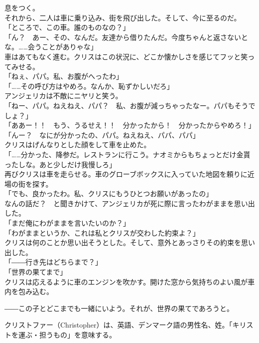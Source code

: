 \documentclass[b5j,10pt,openany]{jsbook}
\begin{document}
息をつく。\\それから、二人は車に乗り込み、街を飛び出した。そして、今に至るのだ。\\「ところで、この車。誰のものなの？」\\「ん？　あー、その、なんだ。友達から借りたんだ。今度ちゃんと返さないとな。\ldots{}\ldots{}会うことがありゃな」\\車はあてもなく進む。クリスはこの状況に、どこか懐かしさを感じてフッと笑ってみせる。\\「ねぇ、パパ。私、お腹がへったわ」\\「\ldots{}\ldots{}その呼び方はやめろ。なんか、恥ずかしいだろ」\\アンジェリカは不敵にニヤリと笑う。\\「ねー、パパ。ねえねえ、パパ？　私、お腹が減っちゃったなー。パパもそうでしょ？」\\「ああー！！　もう、うるせえ！！　分かったから！　分かったからやめろ！」\\「んー？　なにが分かったの、パパ。ねえねえ、パパ、パパ」\\クリスはげんなりとした顔をして車を止めた。\\「\ldots{}\ldots{}分かった、降参だ。レストランに行こう。ナオミからもちょっとだけ金貰ったしな。あと少しだけ我慢しろ」\\再びクリスは車を走らせる。車のグローブボックスに入っていた地図を頼りに近場の街を探す。\\「でも、良かったわ。私、クリスにもうひとつお願いがあったの」\\なんの話だ？　と聞きかけて、アンジェリカが死に際に言ったわがままを思い出した。\\「まだ俺にわがままを言いたいのか？」\\「わがままというか、これは私とクリスが交わした約束よ？」\\クリスは何のことか思い出そうとした。そして、意外とあっさりその約束を思い出した。\\「――行き先はどちらまで？」\\「世界の果てまで」\\クリスは応えるように車のエンジンを吹かす。開けた窓から気持ちのよい風が車内を包み込む。

――この子とどこまでも一緒にいよう。それが、世界の果てであろうと。

クリストファー（Christopher）は、英語、デンマーク語の男性名、姓。「キリストを運ぶ・担うもの」を意味する。
\end{document}
